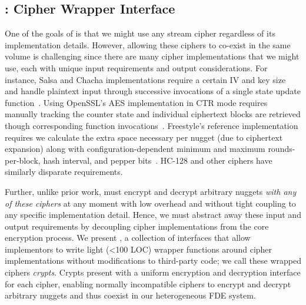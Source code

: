 \subsection{\sysB: Cipher Wrapper Interface}\label{subsec:des-crypts}

One of the goals of \sys is that we might use any stream cipher regardless of
its implementation details. However, allowing these ciphers to co-exist in the
same volume is challenging since there are many cipher implementations
that we might use, each with unique input requirements and output
considerations. For instance, Salsa and Chacha implementations require a certain
IV and key size and handle plaintext input through successive invocations of a
single state update function~\cite{Floodyberry}. Using OpenSSL's AES
implementation in CTR mode requires manually tracking the counter state and
individual ciphertext blocks are retrieved though corresponding function
invocations~\cite{OpenSSL}. Freestyle's reference implementation requires we
calculate the extra space necessary per nugget (due to ciphertext expansion)
along with configuration-dependent minimum and maximum rounds-per-block, hash
interval, and pepper bits~\cite{Freestyle}. HC-128 and other ciphers have
similarly disparate requirements.

Further, unlike prior work, \sys must encrypt and decrypt arbitrary
nuggets {\em with any of these ciphers} at any moment with low
overhead and without tight coupling to any specific implementation
detail. Hence, we must abstract away these input and output
requirements by decoupling cipher implementations from the core
encryption process. We present \sysB, a collection of interfaces that
allow implementors to write light (<100 LOC) wrapper functions around
cipher implementations without modifications to third-party code; we
call these wrapped ciphers {\em crypts}. Crypts present \sys with a
uniform encryption and decryption interface for each cipher, enabling
normally incompatible ciphers to encrypt and decrypt arbitrary nuggets
and thus coexist in our heterogeneous FDE system.

